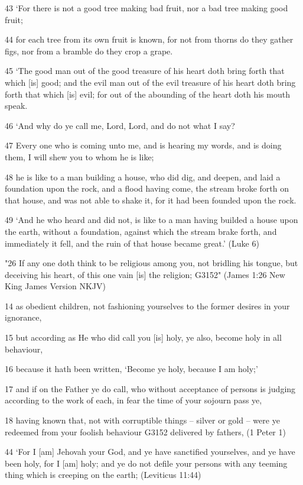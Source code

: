 \documentclass[11pt]{article}
\begin{document}
43 `For there is not a good tree making bad fruit, nor a bad tree making good fruit;

44 for each tree from its own fruit is known, for not from thorns do they gather figs, nor from a bramble do they crop a grape.

45 `The good man out of the good treasure of his heart doth bring forth that which [is] good; and the evil man out of the evil treasure of his heart doth bring forth that which [is] evil; for out of the abounding of the heart doth his mouth speak.

46 `And why do ye call me, Lord, Lord, and do not what I say?

47 Every one who is coming unto me, and is hearing my words, and is doing them, I will shew you to whom he is like;

48 he is like to a man building a house, who did dig, and deepen, and laid a foundation upon the rock, and a flood having come, the stream broke forth on that house, and was not able to shake it, for it had been founded upon the rock.

49 `And he who heard and did not, is like to a man having builded a house upon the earth, without a foundation, against which the stream brake forth, and immediately it fell, and the ruin of that house became great.' (Luke 6)\newline

"26 If any one doth think to be religious among you, not bridling his tongue, but deceiving his heart, of this one vain [is] the religion; G3152"
(James 1:26 New King James Version NKJV)\newline


14 as obedient children, not fashioning yourselves to the former desires in your ignorance,

15 but according as He who did call you [is] holy, ye also, become holy in all behaviour,

16 because it hath been written, `Become ye holy, because I am holy;'

17 and if on the Father ye do call, who without acceptance of persons is judging according to the work of each, in fear the time of your sojourn pass ye,

18 having known that, not with corruptible things -- silver or gold -- were ye redeemed from your foolish behaviour G3152 delivered by fathers,
(1 Peter 1)\newline

44 `For I [am] Jehovah your God, and ye have sanctified yourselves, and ye have been holy, for I [am] holy; and ye do not defile your persons with any teeming thing which is creeping on the earth;
(Leviticus 11:44)\newline
\end{document}
